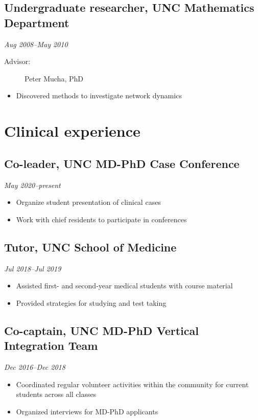 \documentclass{article}
\newcommand{\dateformat}[1]{\textit{#1}}
\begin{document}
  \subsection*{Undergraduate researcher, UNC Mathematics Department}
    \dateformat{Aug 2008--May 2010}
    \begin{description}
      \item[Advisor:] Peter Mucha, PhD
    \end{description}
    \begin{itemize}
      \item Discovered methods to investigate network dynamics
    \end{itemize}
    
\section*{Clinical experience}
  \subsection*{Co-leader, UNC MD-PhD Case Conference}
    \dateformat{May 2020--present}
    \begin{itemize}
      \item Organize student presentation of clinical cases
      \item Work with chief residents to participate in conferences
    \end{itemize}

  \subsection*{Tutor, UNC School of Medicine}
    \dateformat{Jul 2018--Jul 2019}
    \begin{itemize}
      \item Assisted first- and second-year medical students with course material
      \item Provided strategies for studying and test taking
    \end{itemize}

  \subsection*{Co-captain, UNC MD-PhD Vertical Integration Team}
    \dateformat{Dec 2016--Dec 2018}
    \begin{itemize}
        \item Coordinated regular volunteer activities within the community for current students across all classes
        \item Organized interviews for MD-PhD applicants
    \end{itemize}
\end{document}
